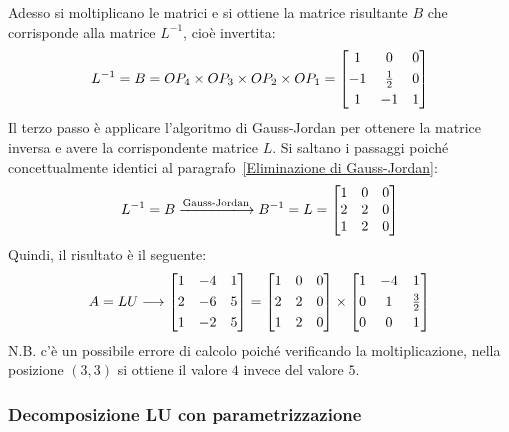 \documentclass[a4paper]{article}
\makeatletter
\newenvironment{rowequmatbra}[1]{\left[\array{@{}#1@{}}}{\endarray\right]}
\makeatother
\begin{document}
	Adesso si moltiplicano le matrici e si ottiene la matrice risultante $B$ che corrisponde alla matrice $L^{-1}$, cioè invertita:
	\begin{equation*}
		L^{-1} = B = OP_{4} \times OP_{3} \times OP_{2} \times OP_{1} =
		\begin{rowequmatbra}{ccc}
			 1 &  		   0  & 0 \\ [0.3em]
			-1 &  \frac{1}{2} & 0 \\ [0.3em]
			 1 & 		  -1  & 1
		\end{rowequmatbra}
	\end{equation*}
	Il \textcolor{Red3}{terzo passo} è applicare l'algoritmo di Gauss-Jordan per ottenere la matrice inversa e avere la corrispondente matrice $L$. Si saltano i passaggi poiché concettualmente identici al paragrafo~\ref{Eliminazione di Gauss-Jordan}:
	\begin{equation*}
		L^{-1} = B \xlongrightarrow{\text{Gauss-Jordan}} B^{-1} = L = \begin{bmatrix}
			1 & 0 & 0 \\
			2 & 2 & 0 \\
			1 & 2 & 0
		\end{bmatrix}
	\end{equation*}
	Quindi, il risultato è il seguente:
	\begin{equation*}
		A = LU \longrightarrow \begin{rowequmatbra}{ccc}
			1 & -4 & 1 \\ [0.3em]
			2 & -6 & 5 \\ [0.3em]
			1 & -2 & 5
		\end{rowequmatbra} = \begin{rowequmatbra}{ccc}
			1 & 0 & 0 \\ [0.3em]
			2 & 2 & 0 \\ [0.3em]
			1 & 2 & 0
		\end{rowequmatbra} \times \begin{rowequmatbra}{ccc}
			1 & -4 & 1 \\ [0.3em]
			0 &  1 & \frac{3}{2} \\ [0.3em]
			0 &  0 & 1
		\end{rowequmatbra}
	\end{equation*}
	N.B. c'è un possibile errore di calcolo poiché verificando la moltiplicazione, nella posizione $\left(3,3\right)$ si ottiene il valore $4$ invece del valore $5$.\newpage
	
	\subsubsection{Decomposizione LU con parametrizzazione}
	
\end{document}
